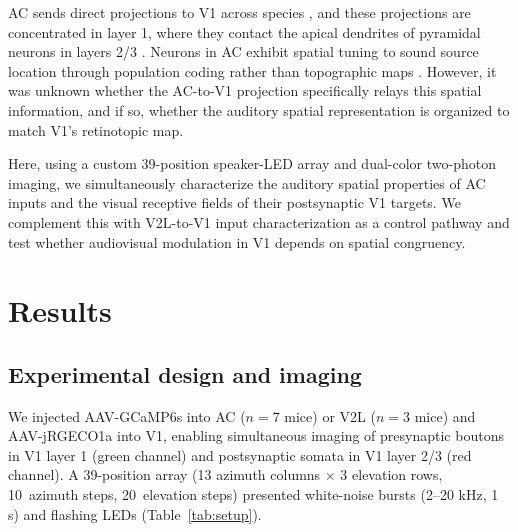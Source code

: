 \documentclass[11pt]{article}
\begin{document}
AC sends direct projections to V1 across species \citep{bizley2007, iurilli2012, ibrahim2016}, and these projections are concentrated in layer 1, where they contact the apical dendrites of pyramidal neurons in layers 2/3 \citep{ibrahim2016}. Neurons in AC exhibit spatial tuning to sound source location through population coding rather than topographic maps \citep{middlebrooks1994, stecker2005}. However, it was unknown whether the AC-to-V1 projection specifically relays this spatial information, and if so, whether the auditory spatial representation is organized to match V1's retinotopic map.

Here, using a custom 39-position speaker-LED array and dual-color two-photon imaging, we simultaneously characterize the auditory spatial properties of AC inputs and the visual receptive fields of their postsynaptic V1 targets. We complement this with V2L-to-V1 input characterization as a control pathway and test whether audiovisual modulation in V1 depends on spatial congruency.

\section{Results}

\subsection{Experimental design and imaging}

We injected AAV-GCaMP6s into AC ($n = 7$ mice) or V2L ($n = 3$ mice) and AAV-jRGECO1a into V1, enabling simultaneous imaging of presynaptic boutons in V1 layer 1 (green channel) and postsynaptic somata in V1 layer 2/3 (red channel). A 39-position array (13 azimuth columns $\times$ 3 elevation rows, 10\textdegree\ azimuth steps, 20\textdegree\ elevation steps) presented white-noise bursts (2--20 kHz, 1 s) and flashing LEDs (Table~\ref{tab:setup}).
\end{document}
